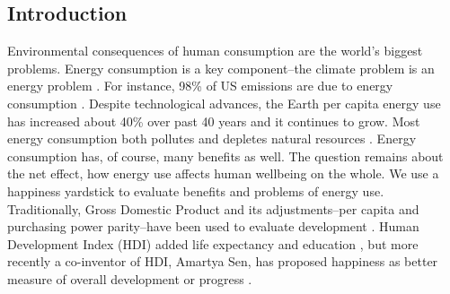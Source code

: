 \documentclass[10pt, letterpaper]{article}
\begin{document}
\begin{spacing}{1.0}




\section*{\large \bf Introduction} %

Environmental consequences of human consumption are the world's biggest
problems.  Energy consumption is a key component--the climate problem is an
energy problem \citep{mackay08}. For instance, 98\% of US emissions are due to
energy consumption \citep{eia08}. Despite
technological advances, the Earth per capita energy use has increased about 40\%
over past 40 years and it continues to grow. %
Most energy consumption both pollutes and  depletes natural resources
\citep{arrow04, soytas07}. %
 Energy consumption has, of course, many benefits as well.
 The question remains about the net effect, how energy use affects human
 wellbeing on the whole.
We use a happiness yardstick
to evaluate benefits and problems of energy use. Traditionally, Gross Domestic
Product and its adjustments--per capita and purchasing power parity--have been
used to evaluate development \citep{jorgenson14C}. Human Development Index (HDI)
added life expectancy and education \citep{steinberger10}, but more recently a
co-inventor of HDI, Amartya Sen, has proposed happiness as better measure of
overall development or progress  \citep{stiglitz09al}. 


\end{spacing}
\end{document}
